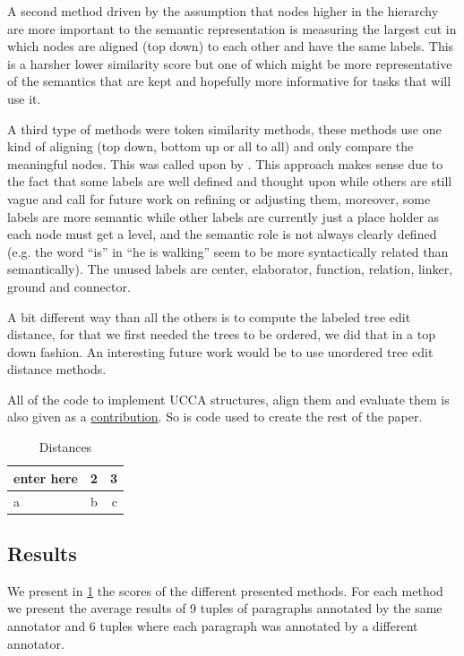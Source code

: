 \documentclass[english]{article}
\begin{document}
A second method driven by the assumption that nodes higher in the
hierarchy are more important to the semantic representation is measuring
the largest cut in which nodes are aligned (top down) to each other
and have the same labels. This is a harsher lower similarity
score but one of which might be more representative of the semantics
that are kept and hopefully more informative for tasks that will use it.

A third type of methods were token similarity methods, these methods
use one kind of aligning (top down, bottom up or all to all) and only
compare the meaningful nodes. This was called upon by \cite{sulem2015conceptual}. 
This approach makes sense due to the fact that some labels
are well defined and thought upon while others are still vague and
call for future work on refining or adjusting them, moreover, some
labels are more semantic while other labels are currently just a place
holder as each node must get a level, and the semantic role is not
always clearly defined (e.g. the word ``is'' in ``he is walking''
seem to be more syntactically related than semantically). The unused
labels are center, elaborator, function, relation, linker, ground
and connector.

A bit different way than all the others is to compute the labeled
tree edit distance\cite{zhang1989simple}, for that we first needed
the trees to be ordered, we did that in a top down fashion. An interesting
future work would be to use unordered tree edit distance methods\cite{zhang1992editing}.

All of the code to implement UCCA structures, align them and evaluate
them is also given as a \href{https://github.com/borgr/assess_learner_language}{contribution}.
So is code used to create the rest of the paper.
\begin{table}[h!]
	\centering
	\caption{Distances}
	\label{tab:Distances}
	\begin{tabular}{l|c||r}
		enter here & 2 & 3\\
		\hline
		a & b & c\\
		\end{tabular}
		\end{table}
		
	\subsection{Results}
	
	We present in \ref{tab:Distances} the scores of the different presented
	methods. For each method we present the average results of 9 tuples
	of paragraphs annotated by the same annotator and 6 tuples where each
	paragraph was annotated by a different annotator.
	
\end{document}

